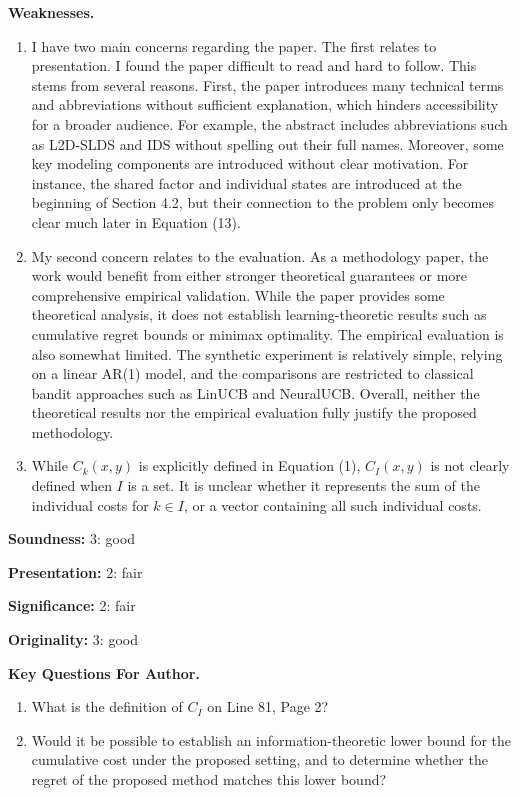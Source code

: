 \textbf{Weaknesses.}
\begin{enumerate}
    \item I have two main concerns regarding the paper. The first relates to presentation. I found the paper difficult to read and hard to follow. This stems from several reasons. First, the paper introduces many technical terms and abbreviations without sufficient explanation, which hinders accessibility for a broader audience. For example, the abstract includes abbreviations such as L2D-SLDS and IDS without spelling out their full names. Moreover, some key modeling components are introduced without clear motivation. For instance, the shared factor and individual states are introduced at the beginning of Section 4.2, but their connection to the problem only becomes clear much later in Equation (13).
    \item My second concern relates to the evaluation. As a methodology paper, the work would benefit from either stronger theoretical guarantees or more comprehensive empirical validation. While the paper provides some theoretical analysis, it does not establish learning-theoretic results such as cumulative regret bounds or minimax optimality. The empirical evaluation is also somewhat limited. The synthetic experiment is relatively simple, relying on a linear AR(1) model, and the comparisons are restricted to classical bandit approaches such as LinUCB and NeuralUCB. Overall, neither the theoretical results nor the empirical evaluation fully justify the proposed methodology.
    \item While $C_k(x, y)$ is explicitly defined in Equation (1), $C_I(x, y)$ is not clearly defined when $I$ is a set. It is unclear whether it represents the sum of the individual costs for $k \in I$, or a vector containing all such individual costs.
\end{enumerate}

\textbf{Soundness:} 3: good

\textbf{Presentation:} 2: fair

\textbf{Significance:} 2: fair

\textbf{Originality:} 3: good

\textbf{Key Questions For Author.}
\begin{enumerate}
    \item What is the definition of $C_I$ on Line 81, Page 2?
    \item Would it be possible to establish an information-theoretic lower bound for the cumulative cost under the proposed setting, and to determine whether the regret of the proposed method matches this lower bound?
\end{enumerate}

